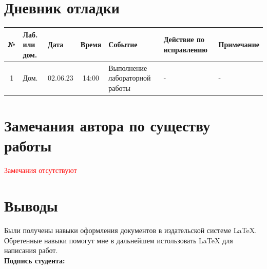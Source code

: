 \documentclass[12pt, letterpaper]{article}
\begin{document}
\section{Дневник отладки}
\begin{tabular}{|c|p{1cm}|p{1.5cm}|c|p{2.5cm}|p{2cm}|p{2.25cm}|}
    \hline
    № & Лаб. или дом. & Дата & Время & Событие & Действие по исправлению & Примечание\\
    \hline
    1 & Дом. & 02.06.23 & 14:00 & Выполнение лабораторной работы & - & -\\
    \hline
\end{tabular}
\section{Замечания автора по существу работы}
\textcolor{red}{Замечания отсутствуют}
\section{Выводы}
Были получены навыки оформления документов в издательской системе \LaTeX{}. Обретенные навыки помогут мне в дальнейшем истользовать \LaTeX{} для написания работ. \\
\flushright \textbf{Подпись студента:} \underline{\hspace{3cm}}
\end{document}

